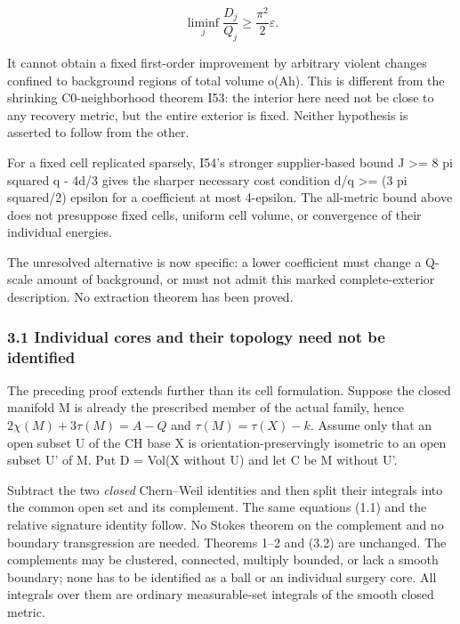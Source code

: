 \documentclass[
  10pt,
]{article}
\begin{document}
\[
 \boxed{\liminf_j\frac{D_j}{Q_j}
                       \ge\frac{\pi^2}{2}\varepsilon.}  \tag{3.2}
\]

It cannot obtain a fixed first-order improvement by arbitrary violent
changes confined to background regions of total volume o(Ah). This is
different from the shrinking C0-neighborhood theorem I53: the interior
here need not be close to any recovery metric, but the entire exterior
is fixed. Neither hypothesis is asserted to follow from the other.

For a fixed cell replicated sparsely, I54's stronger supplier-based
bound J \textgreater= 8 pi squared q - 4d/3 gives the sharper necessary
cost condition d/q \textgreater= (3 pi squared/2) epsilon for a
coefficient at most 4-epsilon. The all-metric bound above does not
presuppose fixed cells, uniform cell volume, or convergence of their
individual energies.

The unresolved alternative is now specific: a lower coefficient must
change a Q-scale amount of background, or must not admit this marked
complete-exterior description. No extraction theorem has been proved.

\hypertarget{individual-cores-and-their-topology-need-not-be-identified}{%
\subsubsection{3.1 Individual cores and their topology need not be
identified}\label{individual-cores-and-their-topology-need-not-be-identified}}

The preceding proof extends further than its cell formulation. Suppose
the closed manifold M is already the prescribed member of the actual
family, hence \(2\chi(M)+3\tau(M)=A-Q\) and \(\tau(M)=\tau(X)-k\).
Assume only that an open subset U of the CH base X is
orientation-preservingly isometric to an open subset U' of M. Put D =
Vol(X without U) and let C be M without U'.

Subtract the two \emph{closed} Chern--Weil identities and then split
their integrals into the common open set and its complement. The same
equations (1.1) and the relative signature identity follow. No Stokes
theorem on the complement and no boundary transgression are needed.
Theorems 1--2 and (3.2) are unchanged. The complements may be clustered,
connected, multiply bounded, or lack a smooth boundary; none has to be
identified as a ball or an individual surgery core. All integrals over
them are ordinary measurable-set integrals of the smooth closed metric.
\end{document}
